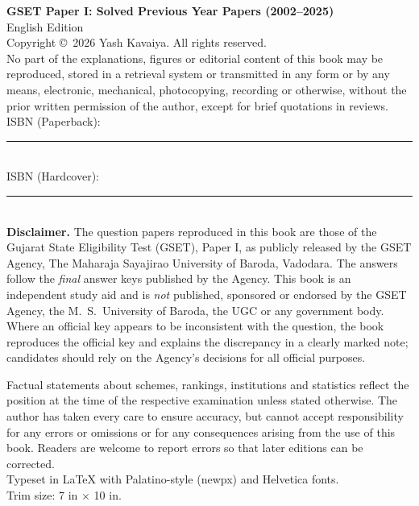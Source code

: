 \thispagestyle{empty}
\vspace*{\fill}
{\small
\textbf{GSET Paper I: Solved Previous Year Papers (2002--2025)}\\
English Edition\\[6pt]
Copyright \copyright\ 2026 Yash Kavaiya. All rights reserved.\\[6pt]
No part of the explanations, figures or editorial content of this book may be reproduced, stored in a retrieval system or transmitted in any form or by any means, electronic, mechanical, photocopying, recording or otherwise, without the prior written permission of the author, except for brief quotations in reviews.\\[6pt]
ISBN (Paperback): \rule{4cm}{0.4pt}\\
ISBN (Hardcover): \rule{4cm}{0.4pt}\\[10pt]
\textbf{Disclaimer.} The question papers reproduced in this book are those of the Gujarat State Eligibility Test (GSET), Paper I, as publicly released by the GSET Agency, The Maharaja Sayajirao University of Baroda, Vadodara. The answers follow the \emph{final} answer keys published by the Agency. This book is an independent study aid and is \emph{not} published, sponsored or endorsed by the GSET Agency, the M.~S.~University of Baroda, the UGC or any government body. Where an official key appears to be inconsistent with the question, the book reproduces the official key and explains the discrepancy in a clearly marked note; candidates should rely on the Agency's decisions for all official purposes.

Factual statements about schemes, rankings, institutions and statistics reflect the position at the time of the respective examination unless stated otherwise. The author has taken every care to ensure accuracy, but cannot accept responsibility for any errors or omissions or for any consequences arising from the use of this book. Readers are welcome to report errors so that later editions can be corrected.\\[10pt]
Typeset in \LaTeX{} with Palatino-style (newpx) and Helvetica fonts.\\
Trim size: 7 in $\times$ 10 in.
}
\newpage
